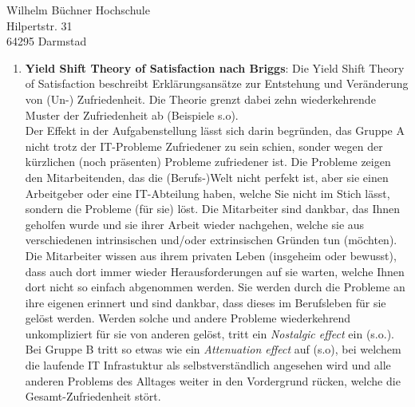 \documentclass[
    version=last,           %
    DIV=13,                 %
    BCOR=0mm,               %
    paper=a4,               %
    fontsize=12pt,          %
    firsthead=on,           %
    firstfoot=on,           %
    pagenumber=on,i         %
    parskip=half,           %
    enlargefirstpage=,      %
    firsthead=on,           %
    fromrule=afteraddress,  %
    priority=off,           %
    backaddress=true,       %
    refline=dateright,      %
	fromalign=right,	    %
    fromemail=on,i          %
    fromurl=on,             %
    frombank=on,
    fromphone=on,           %
    frommobilephone=on      %
    fromlogo=on,            %
    addrfield=on,           %
    subject=untitled,  %
    foldmarks=off,          %
    numericaldate=off,      %
	pagenumber=right,	        %
	parskip=half,	        %
    headsep=false,          %
    footsepline=true,       %
    foldmarks=off,		    %
	]{scrlttr2}
\begin{document}
\begin{letter} {Wilhelm Büchner Hochschule \\
Hilpertstr. 31\\
64295 Darmstad}
\begin{itemize}
\begin{enumerate}
            \vspace{1cm}
        \item \textbf{Yield Shift Theory of Satisfaction nach Briggs}:
            Die Yield Shift Theory of Satisfaction beschreibt Erklärungsansätze
            zur Entstehung und Veränderung von (Un-) Zufriedenheit. Die Theorie
            grenzt dabei zehn wiederkehrende Muster der Zufriedenheit ab
            (Beispiele s.o).
            \\
            Der Effekt in der Aufgabenstellung lässt sich darin begründen, das
            Gruppe A nicht trotz der IT-Probleme Zufriedener zu sein schien,
            sonder wegen der kürzlichen (noch präsenten) Probleme zufriedener
            ist. Die Probleme zeigen den Mitarbeitenden, das die (Berufs-)Welt
            nicht perfekt ist, aber sie einen Arbeitgeber oder eine IT-Abteilung
            haben, welche Sie nicht im Stich lässt, sondern die Probleme (für
            sie) löst. Die Mitarbeiter sind dankbar, das Ihnen geholfen wurde
            und sie ihrer Arbeit wieder nachgehen, welche sie aus verschiedenen
            intrinsischen und/oder extrinsischen Gründen tun (möchten). Die
            Mitarbeiter wissen aus ihrem privaten Leben (insgeheim oder
            bewusst), dass auch dort immer wieder Herausforderungen auf sie
            warten, welche Ihnen dort nicht so einfach abgenommen werden. Sie
            werden durch die Probleme an ihre eigenen erinnert und sind dankbar,
            dass dieses im Berufsleben für sie gelöst werden.
            Werden solche und andere Probleme wiederkehrend unkompliziert für
            sie von anderen gelöst, tritt ein \textit{Nostalgic effect} ein
            (s.o.).
            \\
            Bei Gruppe B
            tritt so etwas wie ein \textit{Attenuation effect} auf (s.o), bei
            welchem die laufende IT Infrastuktur als selbstverständlich
            angesehen wird und alle anderen Problems des Alltages weiter in den
            Vordergrund rücken, welche die Gesamt-Zufriedenheit stört.


\end{enumerate}
\end{itemize}
\end{letter}
\end{document}
